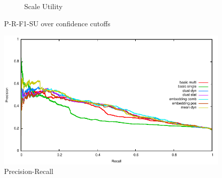 \documentclass{article}
\begin{document}
{{\begin{figure}[tb]
\begin{subfigure}[b]{\officialRunWidth}
			\caption{Scale Utility}
			\label{official:su}
    \end{subfigure}
\caption{P-R-F1-SU over confidence cutoffs}
\label{officialruns}
\end{figure}


\begin{figure}[tb]
\centering
\includegraphics[width=.5\textwidth]{fig/pr/overlapped.pdf}
\caption{Precision-Recall}
\label{precrecall}
\end{figure}

}}
\end{document}
